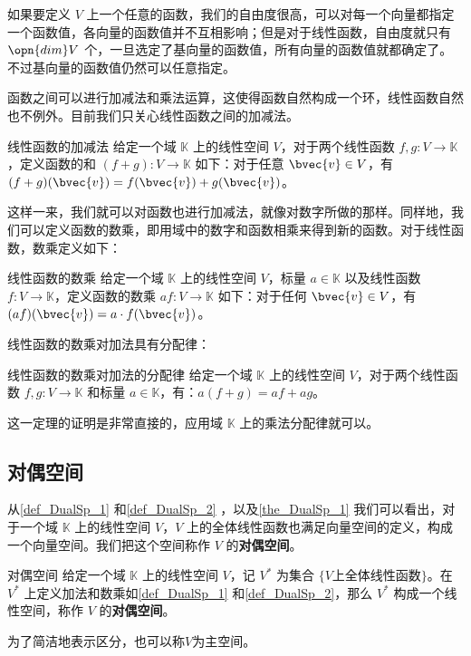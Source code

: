 如果要定义 $V$ 上一个任意的函数，我们的自由度很高，可以对每一个向量都指定一个函数值，各向量的函数值并不互相影响；但是对于线性函数，自由度就只有 $\opn{dim} V$ 个，一旦选定了基向量的函数值，所有向量的函数值就都确定了。不过基向量的函数值仍然可以任意指定。

函数之间可以进行加减法和乘法运算，这使得函数自然构成一个环，线性函数自然也不例外。目前我们只关心线性函数之间的加减法。

\begin{definition}{线性函数的加减法}\label{def_DualSp_1}
给定一个域 $\mathbb{K}$ 上的线性空间 $V$，对于两个线性函数 $f, g: V\rightarrow\mathbb{K}$，定义函数的和 $(f+g):V\rightarrow\mathbb{K}$ 如下：对于任意 $\bvec{v}\in V$，有 $(f+g)(\bvec{v})=f(\bvec{v})+g(\bvec{v})$。
\end{definition}

这样一来，我们就可以对函数也进行加减法，就像对数字所做的那样。同样地，我们可以定义函数的数乘，即用域中的数字和函数相乘来得到新的函数。对于线性函数，数乘定义如下：

\begin{definition}{线性函数的数乘}\label{def_DualSp_2}
给定一个域 $\mathbb{K}$ 上的线性空间 $V$，标量 $a\in\mathbb{K}$ 以及线性函数 $f: V\rightarrow\mathbb{K}$，定义函数的数乘 $af:V\rightarrow\mathbb{K}$ 如下：对于任何 $\bvec{v}\in V$，有 $(af)(\bvec{v})=a\cdot f(\bvec{v})$。
\end{definition}

线性函数的数乘对加法具有分配律：

\begin{theorem}{线性函数的数乘对加法的分配律}\label{the_DualSp_1}
给定一个域 $\mathbb{K}$ 上的线性空间 $V$，对于两个线性函数 $f, g: V\rightarrow\mathbb{K}$ 和标量 $a\in\mathbb{K}$，有：$a(f+g)=af+ag$。
\end{theorem}

这一定理的证明是非常直接的，应用域 $\mathbb{K}$ 上的乘法分配律就可以。

\subsection{对偶空间}

从\autoref{def_DualSp_1} 和\autoref{def_DualSp_2} ，以及\autoref{the_DualSp_1} 我们可以看出，对于一个域 $\mathbb{K}$ 上的线性空间 $V$，$V$ 上的全体线性函数也满足向量空间的定义，构成一个向量空间。我们把这个空间称作 $V$ 的\textbf{对偶空间}。

\begin{definition}{对偶空间}
给定一个域 $\mathbb{K}$ 上的线性空间 $V$，记 $V^*$ 为集合 $\{V\text{上全体线性函数}\}$。在 $V^*$ 上定义加法和数乘如\autoref{def_DualSp_1} 和\autoref{def_DualSp_2}，那么 $V^*$ 构成一个线性空间，称作 $V$ 的\textbf{对偶空间}。

为了简洁地表示区分，也可以称$V$为主空间。
\end{definition}

